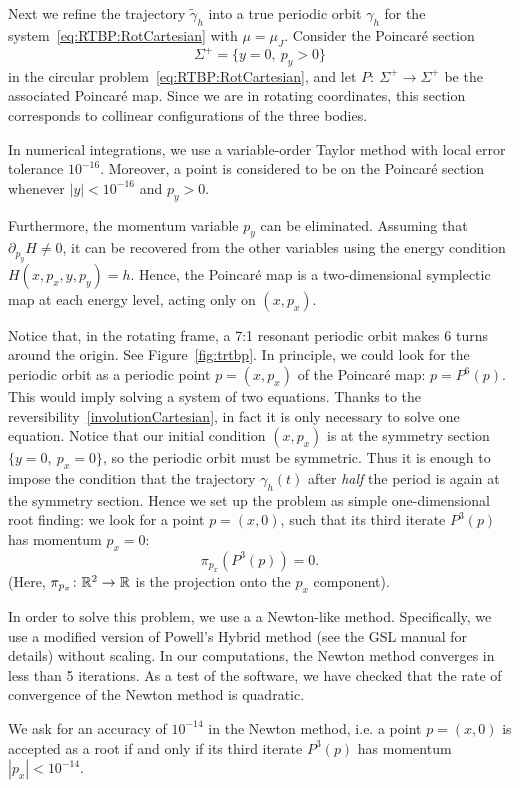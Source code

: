 Next we refine the trajectory $\tilde \gamma_h$ into a true periodic
orbit $\gamma_h$ for the system~\eqref{eq:RTBP:RotCartesian} with
$\mu=\mu_J$.
Consider the Poincar\'e section
\[ \Sigma^+ = \{ y=0,\ p_y>0 \} \]
in the circular problem~\eqref{eq:RTBP:RotCartesian}, and let $P\colon\
\Sigma^+\to\Sigma^+$ be the associated Poincar\' e map. Since we are in rotating coordinates, this section corresponds to collinear configurations
of the three bodies.

\begin{remark}
In numerical integrations, we use a variable-order Taylor method with
local error tolerance $10^{-16}$.
Moreover, a point is considered to be on the Poincar\'e section whenever
$|y|<10^{-16}$ and $p_y>0$.
\end{remark}
Furthermore, the momentum variable $p_y$ can be eliminated. 
Assuming that $\partial_{p_y} H \neq 0$, it can be recovered from the
other variables using the energy condition $H(x,p_x,y,p_y)=h$. 
Hence, the Poincar\'e map is a two-dimensional symplectic map
at each energy level, acting only on $(x,p_x)$.

Notice that, in the rotating frame, a 7:1 resonant periodic orbit
makes $6$ turns around the origin. See Figure~\ref{fig:trtbp}.
In principle, we could look for the periodic orbit as a periodic point
$p=(x,p_x)$ of the Poincar\'e map: $p=P^6(p)$. This would imply solving
a system of two equations.
Thanks to the reversibility~\eqref{involutionCartesian},
in fact it is only necessary to solve one equation.
Notice that our initial condition $(x,p_x)$ is at the symmetry
section $\{y=0,\ p_x=0\}$, so the periodic orbit must be symmetric. 
Thus it is enough to impose the condition that the trajectory
$\gamma_h(t)$ after \emph{half} the period is again at the symmetry
section. 
Hence we set up the problem as simple one-dimensional root finding:
we look for a point $p=(x,0)$, such that its third iterate $P^3(p)$
has momentum $p_x=0$:
\[ \pi_{p_x}(P^3(p)) = 0. \]
(Here, $\pi_{p_x}\colon \mathbb{R}^2\to \mathbb{R}$ is the projection onto the $p_x$
component).

In order to solve this problem, we use a a Newton-like method. 
Specifically, we use a modified version of Powell's Hybrid method (see
the GSL manual for details) without scaling.
In our computations, the Newton method converges in less than 5
iterations.
As a test of the software, we have checked that the rate of
convergence of the Newton method is quadratic.

\begin{remark}
We ask for an accuracy of $10^{-14}$ in the Newton method,
i.e. a point $p=(x,0)$ is accepted as a root if and only if its third iterate
$P^3(p)$ has momentum $|p_x|<10^{-14}$.
\end{remark}

